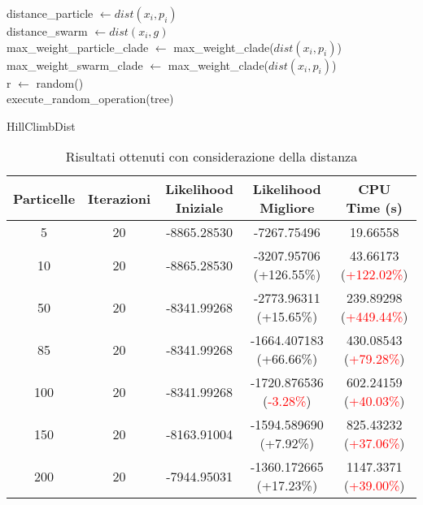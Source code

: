 \begin{algorithm}[H]
    distance\_particle $\gets dist(x_i, p_i)$ \\
    distance\_swarm $\gets dist(x_i, g)$ \\
    max\_weight\_particle\_clade $\gets$ max\_weight\_clade($dist(x_i, p_i)$) \\
    max\_weight\_swarm\_clade $\gets$ max\_weight\_clade($dist(x_i, p_i)$) \\
    r $\gets$ random() \\
    execute\_random\_operation(tree)
    \caption{HillClimbDist}
    \label{algo:pso-adapt-calculate-4-algo}
\end{algorithm}
\begin{table}[!h]
  \centering
  \begin{tabular}{*{5}{c}}
    Particelle & Iterazioni & Likelihood Iniziale & Likelihood Migliore & CPU Time (s) \\ \midrule \midrule
    5 & 20 & -8865.28530 & -7267.75496 & 19.66558 \\
    10 & 20 & -8865.28530 & -3207.95706 (\textcolor{ao(english)}{+126.55\%}) & 43.66173 (\textcolor{red}{+122.02\%}) \\
    50 & 20 & -8341.99268 & -2773.96311 (\textcolor{ao(english)}{+15.65\%}) & 239.89298 (\textcolor{red}{+449.44\%}) \\
    85 & 20 & -8341.99268 & -1664.407183 (\textcolor{ao(english)}{+66.66\%}) & 430.08543 (\textcolor{red}{+79.28\%}) \\
    100 & 20 & -8341.99268 & -1720.876536 (\textcolor{red}{-3.28\%}) & 602.24159 (\textcolor{red}{+40.03\%}) \\
    150 & 20 & -8163.91004 & -1594.589690 (\textcolor{ao(english)}{+7.92\%}) & 825.43232 (\textcolor{red}{+37.06\%}) \\
    200 & 20 & -7944.95031 & -1360.172665 (\textcolor{ao(english)}{+17.23\%}) & 1147.3371 (\textcolor{red}{+39.00\%}) \\
  \end{tabular}
  \caption{Risultati ottenuti con considerazione della distanza}
  \label{tab:pso-adapt-calculate-4-table}
\end{table}

